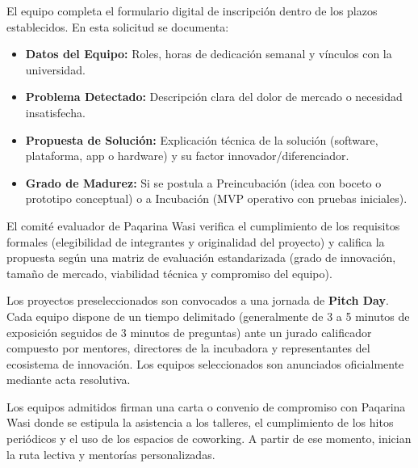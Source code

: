 ﻿\documentclass[12pt,a4paper]{article}
\begin{document}
\begin{tcolorbox}[colback=white,colframe=boxOrange,title={\textbf{Fase 3: Registro y Formulario de Postulación}},fonttitle=\bfseries]
El equipo completa el formulario digital de inscripción dentro de los plazos establecidos. En esta solicitud se documenta:
\begin{itemize}[leftmargin=*]
    \item \textbf{Datos del Equipo:} Roles, horas de dedicación semanal y vínculos con la universidad.
    \item \textbf{Problema Detectado:} Descripción clara del dolor de mercado o necesidad insatisfecha.
    \item \textbf{Propuesta de Solución:} Explicación técnica de la solución (software, plataforma, app o hardware) y su factor innovador/diferenciador.
    \item \textbf{Grado de Madurez:} Si se postula a Preincubación (idea con boceto o prototipo conceptual) o a Incubación (MVP operativo con pruebas iniciales).
\end{itemize}
\end{tcolorbox}

\begin{tcolorbox}[colback=white,colframe=boxPurple,title={\textbf{Fase 4: Evaluación Técnica y Filtro de Elegibilidad}},fonttitle=\bfseries]
El comité evaluador de Paqarina Wasi verifica el cumplimiento de los requisitos formales (elegibilidad de integrantes y originalidad del proyecto) y califica la propuesta según una matriz de evaluación estandarizada (grado de innovación, tamaño de mercado, viabilidad técnica y compromiso del equipo).
\end{tcolorbox}

\begin{tcolorbox}[colback=white,colframe=tierAStar,title={\textbf{Fase 5: Pitch Day y Selección Final}},fonttitle=\bfseries]
Los proyectos preseleccionados son convocados a una jornada de \textbf{Pitch Day}. Cada equipo dispone de un tiempo delimitado (generalmente de 3 a 5 minutos de exposición seguidos de 3 minutos de preguntas) ante un jurado calificador compuesto por mentores, directores de la incubadora y representantes del ecosistema de innovación. Los equipos seleccionados son anunciados oficialmente mediante acta resolutiva.
\end{tcolorbox}

\begin{tcolorbox}[colback=white,colframe=unsaacBlue,title={\textbf{Fase 6: Firma de Acta de Compromiso e Inicio}},fonttitle=\bfseries]
Los equipos admitidos firman una carta o convenio de compromiso con Paqarina Wasi donde se estipula la asistencia a los talleres, el cumplimiento de los hitos periódicos y el uso de los espacios de coworking. A partir de ese momento, inician la ruta lectiva y mentorías personalizadas.
\end{tcolorbox}
\end{document}
